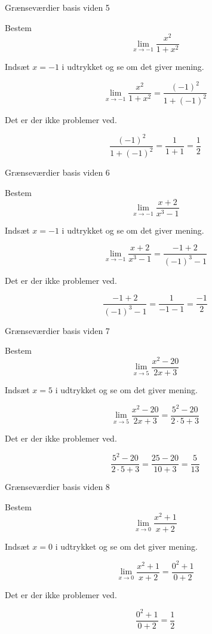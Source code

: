 \documentclass{article}
\begin{document}
\newpage
\begin{exercise}{Grænseværdier basis viden 5}

Bestem \[\lim_{x \to -1} \frac{x^2}{1 + x^2}\]



\hint
Indsæt $x=-1$ i udtrykket og se om det giver mening.

\hint
\[
\lim_{x \to -1} \frac{x^2}{1 + x^2} = \frac{(-1)^2}{1 + (-1)^2}
\]

\hint
Det er der ikke problemer ved.

\hint
\[
\frac{(-1)^2}{1 + (-1)^2} = \frac{1}{1 + 1} = \frac{1}{2}
\]

\end{exercise}

\newpage
\begin{exercise}{Grænseværdier basis viden 6}

Bestem \[\lim_{x \to -1} \frac{x + 2}{x^3 - 1}\]



\hint
Indsæt $x=-1$ i udtrykket og se om det giver mening.

\hint
\[
\lim_{x \to -1} \frac{x + 2}{x^3 - 1} = \frac{-1 + 2}{(-1)^3 - 1}
\]

\hint
Det er der ikke problemer ved.

\hint
\[
 \frac{-1 + 2}{(-1)^3 - 1} = \frac{1}{-1 - 1} = \frac{-1}{2}
\]

\end{exercise}

\newpage
\begin{exercise}{Grænseværdier basis viden 7}

Bestem \[\lim_{x \to 5} \frac{x^2 - 20}{2x + 3}\]



\hint
Indsæt $x=5$ i udtrykket og se om det giver mening.

\hint
\[
\lim_{x \to 5} \frac{x^2 - 20}{2x + 3} = \frac{5^2 - 20}{2 \cdot 5 +3}
\]

\hint
Det er der ikke problemer ved.

\hint
\[
\frac{5^2 - 20}{2 \cdot 5 +3} = \frac{25 - 20}{10 + 3} = \frac{5}{13}
\]

\end{exercise}

\newpage
\begin{exercise}{Grænseværdier basis viden 8}

Bestem \[\lim_{x \to 0} \frac{x^2 + 1}{x + 2}\]



\hint
Indsæt $x=0$ i udtrykket og se om det giver mening.

\hint
\[
\lim_{x \to 0} \frac{x^2 + 1}{x + 2} = \frac{0^2 + 1}{0 + 2}
\]

\hint
Det er der ikke problemer ved.

\hint
\[
 \frac{0^2 + 1}{0 + 2} = \frac{1}{2}
\]

\end{exercise}

\newpage
\end{document}
